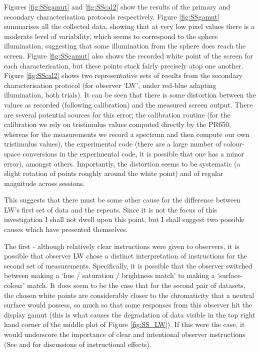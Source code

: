 Figures \ref{fig:SSgamut} and \ref{fig:SScal2} show the results of the primary and secondary characterisation protocols respectively. Figure \ref{fig:SSgamut} summarises all the collected data, showing that at very low pixel values there is a moderate level of variability, which seems to correspond to the sphere illumination, suggesting that some illumination from the sphere does reach the screen. Figure \ref{fig:SSgamut} also shows the recorded white point of the screen for each characterisation, but these points stack fairly precisely atop one another. Figure \ref{fig:SScal2} shows two representative sets of results from the secondary characterisation protocol (for observer `LW', under red-blue adapting illumination, both trials). It can be seen that there is some distortion between the values as recorded (following calibration) and the measured screen output. There are several potential sources for this error; the calibration routine (for the calibration we rely on tristimulus values computed directly by the \gls{PR650}, whereas for the measurements we record a spectrum and then compute our own tristimulus values), the experimental code (there are a large number of colour-space conversions in the experimental code, it is possible that one has a minor error), amongst others. Importantly, the distortion seems to be systematic (a slight rotation of points roughly around the white point) and of regular magnitude across sessions.

This suggests that there must be some other cause for the difference between LW's first set of data and the repeats. Since it is not the focus of this investigation I shall not dwell upon this point, but I shall suggest two possible causes which have presented themselves. 

The first - although relatively clear instructions were given to observers, it is possible that observer LW chose a distinct interpretation of instructions for the second set of measurements. Specifically, it is possible that the observer switched between making a `hue / saturation / brightness match' to making a `surface-colour' match. It does seem to be the case that for the second pair of datasets, the chosen white points are considerably closer to the chromaticity that a neutral surface would possess, so much so that some responses from this observer hit the display gamut (this is what causes the degradation of data visible in the top right hand corner of the middle plot of Figure \ref{fig:SS_LW}). If this were the case, it would underscore the importance of clear and intentional observer instructions (See \citet[p.679]{foster_color_2011} and \citet{arend_simultaneous_1986} for discussions of instructional effects).


